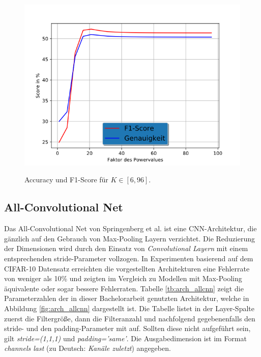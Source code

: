 \begin{figure}[H]
\centering
\includegraphics[scale=0.8]{pictures/konstantenVollesModell}
\label{fig:konstante_baseline}
\caption{Accuracy und F1-Score für $K \in [6, 96]$.}
\end{figure}
 
\subsection{All-Convolutional Net}
Das All-Convolutional Net von Springenberg et al. \parencite{DBLP:journals/corr/SpringenbergDBR14} ist eine CNN-Architektur, die g\"anzlich auf den Gebrauch von Max-Pooling Layern verzichtet. Die Reduzierung der Dimensionen wird durch den Einsatz von \textit{Convolutional Layern} mit einem entsprechenden stride-Parameter vollzogen. In Experimenten basierend auf dem CIFAR-10 Datensatz erreichten die vorgestellten Architekturen eine Fehlerrate von weniger als 10\% und zeigten im Vergleich zu Modellen mit Max-Pooling äquivalente oder sogar bessere Fehlerraten. Tabelle \ref{tb:arch_allcnn} zeigt die Parameterzahlen der in dieser Bachelorarbeit genutzten Architektur, welche in Abbildung \ref{fig:arch_allcnn} dargestellt ist. Die Tabelle listet in der Layer-Spalte zuerst die Filtergr\"o\ss{}e, dann die Filteranzahl und nachfolgend gegebenenfalls den stride- und den padding-Parameter mit auf. Sollten diese nicht aufgef\"uhrt sein, gilt \textit{stride=(1,1,1)} und \textit{padding='same'}. Die Ausgabedimension ist im Format \textit{channels last} (zu Deutsch: \textit{Kanäle zuletzt}) angegeben. 

